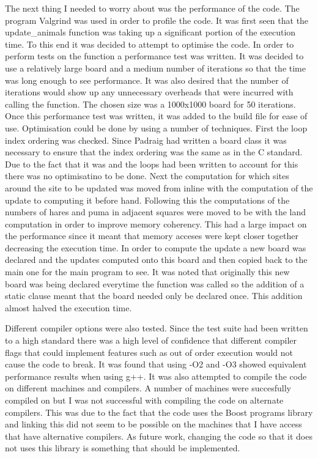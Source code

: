 \documentclass[12pt]{article}    %
\numberwithin{equation}{section}
\begin{document}
The next thing I needed to worry about was the performance of the code.
The program Valgrind was used in order to profile the code.
It was first seen that the update\_animals function was taking up a significant portion of the execution time.
To this end it was decided to attempt to optimise the code.
In order to perform tests on the function a performance test was written.
It was decided to use a relatively large board and a medium number of iterations so that the time was long enough to see performance.
It was also desired that the number of iterations would show up any unnecessary overheads that were incurred with calling the function.
The chosen size was a 1000x1000 board for 50 iterations.
Once this performance test was written, it was added to the build file for ease of use.
Optimisation could be done by using a number of techniques.
First the loop index ordering was checked.
Since Padraig had written a board class it was necessary to ensure that the index ordering was the same as in the C standard.
Due to the fact that it was and the loops had been written to account for this there was no optimisatino to be done.
Next the computation for which sites around the site to be updated was moved from inline with the computation of the update to computing it before hand.
Following this the computations of the numbers of hares and puma in adjacent squares were moved to be with the land computation in order to improve memory coherency.
This had a large impact on the performance since it meant that memory acceses were kept closer together decreasing the execution time.
In order to compute the update a new board was declared and the updates computed onto this board and then copied back to the main one for the main program to see.
It was noted that originally this new board was being declared everytime the function was called so the addition of a static clause meant that the board needed only be declared once.
This addition almost halved the execution time.

Different compiler options were also tested.
Since the test suite had been written to a high standard there was a high level of confidence that different compiler flags that could implement features such as out of order execution would not cause the code to break.
It was found that using -O2 and -O3 showed equivalent performance results when using g++.
It was also attempted to compile the code on different machines and compilers.
A number of machines were succesfully compiled on but I was not successful with compiling the code on alternate compilers.
This was due to the fact that the code uses the Boost programs library and linking this did not seem to be possible on the machines that I have access that have alternative compilers.
As future work, changing the code so that it does not uses this library is something that should be implemented.
\end{document}
